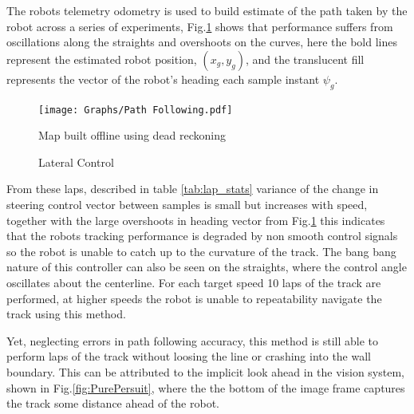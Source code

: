             The robots telemetry odometry is used to build estimate of the path taken by the robot across a series of experiments, Fig.\ref{fig:TrajTrack} shows 
            that performance suffers from oscillations along the straights and overshoots on the curves, here the bold lines represent the estimated robot position,
            $(x_g, y_g)$, and the translucent fill represents the vector of the robot's heading each sample instant $\psi_g$. 
            \begin{figure}[H]
                \centering
                \texttt{[image: Graphs/Path Following.pdf]}
                \caption{Map built offline using dead reckoning}
                \caption{Lateral Control}
                \label{fig:TrajTrack}
            \end{figure}

            From these laps, described in table \ref{tab:lap_stats} variance of the change in steering control vector between samples is small 
            but increases with speed, together with the large overshoots in heading vector from Fig.\ref{fig:TrajTrack} this indicates 
            that the robots tracking performance is degraded by non smooth control signals so the robot is unable to catch up to the curvature of the track.
            The bang bang nature of this controller can also be seen on the straights, where the control angle oscillates about the centerline.             
            For each target speed 10 laps of the track are performed, at higher speeds the robot is unable to repeatability navigate the track using this method. 
  
            Yet, neglecting errors in path following accuracy, this method is still able to perform laps of the track 
            without loosing the line or crashing into the wall boundary. This can be attributed to 
            the implicit look ahead in the vision system, shown in Fig.\ref{fig:PurePersuit}, where the the bottom of the image frame 
            captures the track some distance ahead of the robot. 
            
